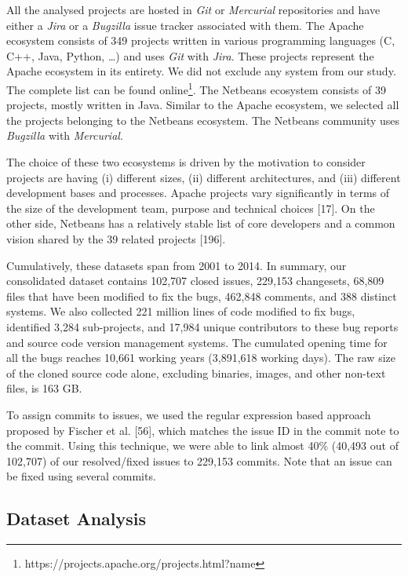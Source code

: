 \documentclass[12pt]{report}
\begin{document}
All the analysed projects are hosted in \emph{Git} or \emph{Mercurial}
repositories and have either a \emph{Jira} or a \emph{Bugzilla} issue
tracker associated with them. The Apache ecosystem consists of 349
projects written in various programming languages (C, C++, Java, Python,
\ldots{}) and uses \emph{Git} with \emph{Jira}. These projects represent
the Apache ecosystem in its entirety. We did not exclude any system from
our study. The complete list can be found
online\footnote{https://projects.apache.org/projects.html?name}. The
Netbeans ecosystem consists of 39 projects, mostly written in Java.
Similar to the Apache ecosystem, we selected all the projects belonging
to the Netbeans ecosystem. The Netbeans community uses \emph{Bugzilla}
with \emph{Mercurial}.

The choice of these two ecosystems is driven by the motivation to
consider projects are having (i) different sizes, (ii) different
architectures, and (iii) different development bases and processes.
Apache projects vary significantly in terms of the size of the
development team, purpose and technical choices {[}17{]}. On the other
side, Netbeans has a relatively stable list of core developers and a
common vision shared by the 39 related projects {[}196{]}.

Cumulatively, these datasets span from 2001 to 2014. In summary, our
consolidated dataset contains 102,707 closed issues, 229,153 changesets,
68,809 files that have been modified to fix the bugs, 462,848 comments,
and 388 distinct systems. We also collected 221 million lines of code
modified to fix bugs, identified 3,284 sub-projects, and 17,984 unique
contributors to these bug reports and source code version management
systems. The cumulated opening time for all the bugs reaches 10,661
working years (3,891,618 working days). The raw size of the cloned
source code alone, excluding binaries, images, and other non-text files,
is 163 GB.

To assign commits to issues, we used the regular expression based
approach proposed by Fischer et al. {[}56{]}, which matches the issue ID
in the commit note to the commit. Using this technique, we were able to
link almost 40\% (40,493 out of 102,707) of our resolved/fixed issues to
229,153 commits. Note that an issue can be fixed using several commits.

\subsection{\texorpdfstring{Dataset
Analysis\label{sec:dataset}}{Dataset Analysis}}\label{dataset-analysis}
\end{document}
